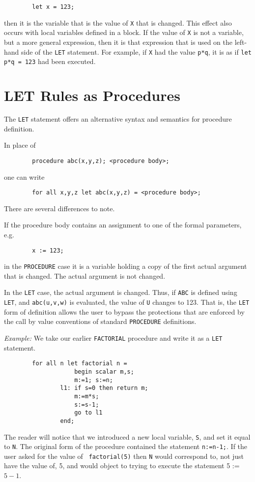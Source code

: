 \begin{verbatim}
        let x = 123;
\end{verbatim}
then it is the variable that is the value of {\tt X} that is changed.
This effect also occurs with local variables defined in a block.  If the
value of {\tt X} is not a variable, but a more general expression, then it
is that expression that is used on the left-hand side of the {\tt LET}
statement.  For example, if {\tt X} had the value {\tt p*q}, it is as if
{\tt let p*q = 123} had been executed.

\section{LET Rules as Procedures}

The {\tt LET} statement offers an alternative syntax and
semantics for procedure definition.

In place of
\begin{verbatim}
        procedure abc(x,y,z); <procedure body>;
\end{verbatim}
one can write
\begin{verbatim}
        for all x,y,z let abc(x,y,z) = <procedure body>;
\end{verbatim}
There are several differences to note.

If the procedure body contains an assignment to one of the formal
parameters, e.g.
\begin{verbatim}
        x := 123;
\end{verbatim}
in the {\tt PROCEDURE} case it is a variable holding a copy of the first
actual argument that is changed.  The actual argument is not changed.

In the {\tt LET} case, the actual argument is changed.  Thus, if {\tt ABC}
is defined using {\tt LET}, and {\tt abc(u,v,w)} is evaluated, the value
of {\tt U} changes to 123.  That is, the {\tt LET} form of definition
allows the user to bypass the protections that are enforced by the call
by value conventions of standard {\tt PROCEDURE} definitions.

{\it Example:}  We take our earlier {\tt FACTORIAL}
procedure and write it as a {\tt LET} statement.
\begin{verbatim}
        for all n let factorial n =
                    begin scalar m,s;
                    m:=1; s:=n;
                l1: if s=0 then return m;
                    m:=m*s;
                    s:=s-1;
                    go to l1
                end;
\end{verbatim}
The reader will notice that we introduced a new local variable, {\tt S},
and set it equal to {\tt N}.  The original form of the procedure contained
the statement {\tt n:=n-1;}.  If the user asked for the value of {\tt
factorial(5)} then {\tt N} would correspond to, not just have the value
of, 5, and {\REDUCE} would object to trying to execute the statement
5 := $5-1$.

